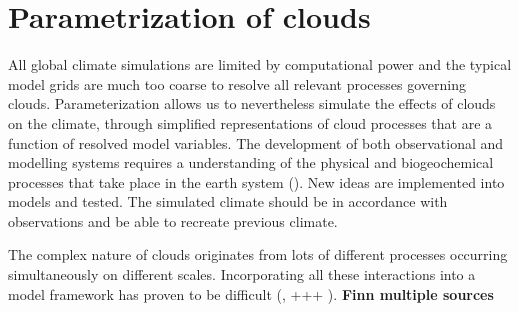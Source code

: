 \section{Parametrization of clouds} \label{sec:param_clouds}
All global climate simulations are limited by computational power and the typical model grids are much too coarse to resolve all relevant processes governing clouds. Parameterization allows us to nevertheless simulate the effects of clouds on the climate, through simplified representations of cloud processes that are a function of resolved model variables. The development of both observational and modelling systems requires a understanding of the physical and biogeochemical processes that take place in the earth system (\cite{Simmons2016Observation2016-2025}). New ideas are implemented into models and tested. The simulated climate should be in accordance with observations and be able to recreate previous climate. 

The complex nature of clouds originates from lots of different processes occurring simultaneously on different scales. Incorporating all these interactions into a model framework has proven to be difficult (\cite{IPCC_CH9_climate_models}, \cite{IPCC_CH7_clouds} +++ ). \textbf{Finn multiple sources} 



